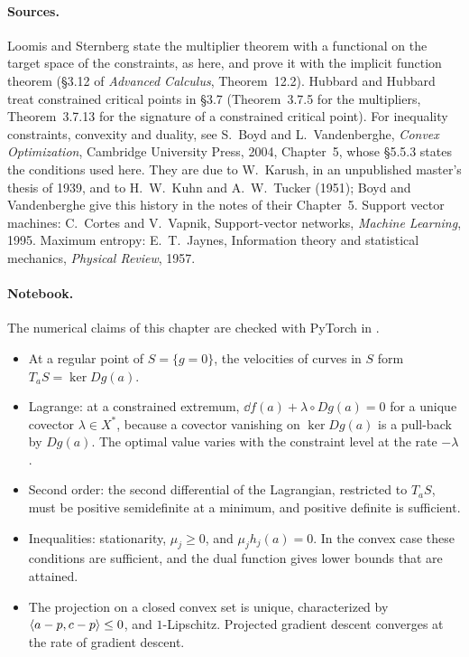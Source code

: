 \begin{notechapter}
\paragraph{Sources.} Loomis and Sternberg state the multiplier theorem
with a functional on the target space of the constraints, as here, and
prove it with the implicit function theorem (\S3.12 of \emph{Advanced
Calculus}, Theorem~12.2). Hubbard and Hubbard treat constrained critical
points in \S3.7 (Theorem~3.7.5 for the multipliers, Theorem~3.7.13 for
the signature of a constrained critical point). For inequality
constraints, convexity and duality, see S.~Boyd and L.~Vandenberghe,
\emph{Convex Optimization}, Cambridge University Press, 2004,
Chapter~5, whose \S5.5.3 states the conditions used here. They are due
to W.~Karush, in an unpublished master's thesis of 1939, and to
H.~W.~Kuhn and A.~W.~Tucker (1951); Boyd and Vandenberghe give this
history in the notes of their Chapter~5. Support vector machines:
C.~Cortes and V.~Vapnik, Support-vector networks, \emph{Machine
Learning}, 1995. Maximum entropy: E.~T.~Jaynes, Information theory and
statistical mechanics, \emph{Physical Review}, 1957.

\paragraph{Notebook.} The numerical claims of this chapter are checked
with PyTorch in .

\begin{chaptersummary}
\begin{itemize}[nosep]
  \item At a regular point of $S = \{g = 0\}$, the velocities of curves
        in $S$ form $T_aS = \ker Dg(a)$.
  \item Lagrange: at a constrained extremum,
        $\dd f(a) + \lambda\circ Dg(a) = 0$ for a unique covector
        $\lambda\in X^*$, because a covector vanishing on $\ker Dg(a)$ is
        a pull-back by $Dg(a)$. The optimal value varies with the
        constraint level at the rate $-\lambda$.
  \item Second order: the second differential of the Lagrangian,
        restricted to $T_aS$, must be positive semidefinite at a minimum,
        and positive definite is sufficient.
  \item Inequalities: stationarity, $\mu_j\geq0$, and
        $\mu_jh_j(a) = 0$. In the convex case these conditions are
        sufficient, and the dual function gives lower bounds that are
        attained.
  \item The projection on a closed convex set is unique, characterized
        by $\left\langle a - p, c - p \right\rangle\leq0$, and $1$-Lipschitz. Projected
        gradient descent converges at the rate of gradient descent.
\end{itemize}
\end{chaptersummary}


\end{notechapter}
